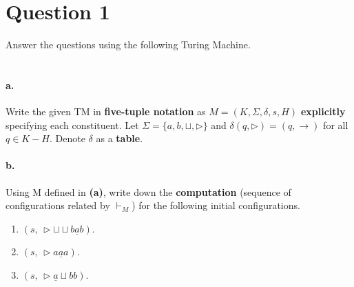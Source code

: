 \documentclass[fleqn,12pt]{article}
\begin{document}
\newpage

\section*{Question 1 \hfill {}}
Answer the questions using the following Turing Machine.
\\ \\

\paragraph{a.} Write the given TM in \textbf{five-tuple notation} as $M = (K, \Sigma, \delta, s, H)$ \textbf{explicitly} specifying each constituent. Let $\Sigma = \{a, b, \sqcup, \triangleright\}$ and $\delta(q, \triangleright) = (q, \rightarrow)$ for all $q \in K-H$. Denote $\delta$ as a \textbf{table}. \hfill {}
\paragraph{b.} Using M defined in \textbf{(a)}, write down the \textbf{computation} (sequence of configurations related by $\vdash_M$) for the following initial configurations. \hfill {}
\begin{enumerate}[\bfseries(i)]
  \item $(s,\,\triangleright\sqcup\sqcup b\underline{a}b)$.
  \item $(s,\,\triangleright a\underline{a}a)$.
  \item $(s,\,\triangleright\underline{a}\sqcup b b)$.
\end{enumerate}
\noindent
\end{document}
